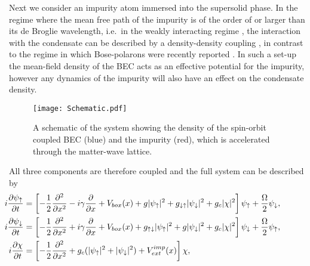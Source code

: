 \documentclass[12pt]{iopart}
\begin{document}
Next we consider an impurity atom immersed into the supersolid phase. 
In the regime where the mean free path of the impurity is of the order of or larger than its de Broglie wavelength, i.e.~in the weakly interacting regime \cite{grusdt:2015,grusdt:2017,Lingua:2018}, the interaction with the condensate can be described by a density-density coupling \cite{Bruderer_2008}, in contrast to the regime in which Bose-polarons were recently reported \cite{parish:2015,parish:2018}. In such a set-up the mean-field density of the BEC acts as an effective potential for the impurity, however any dynamics of the impurity will also have an effect on the condensate density. 
\begin{figure}[tb]
    \centering
    \texttt{[image: Schematic.pdf]}
    \caption{A schematic of the system showing the density of the spin-orbit coupled BEC (blue) and the impurity (red), which is accelerated through the matter-wave lattice.}
    \label{fig:Schematic}
\end{figure}
%
All three components are therefore coupled and the full system can  be described by
\begin{eqnarray}
    \hspace*{-40pt} 
    i\frac{\partial\psi_{\uparrow}}{\partial t} &=\left[-\frac{1}{2}\frac{\partial^2}{\partial x^2}-i \gamma \frac{\partial}{\partial x}+V_{box}(x)+g|\psi_{\uparrow}|^2+ g_{\downarrow \uparrow}|\psi_{\downarrow}|^2+{g}_c|\chi|^2 \right]\psi_{\uparrow}
  + \frac{\Omega}{2}\psi_{\downarrow},
  \label{eq:CGPE1}\\
\hspace*{-40pt} i\frac{\partial\psi_{\downarrow}}{\partial t} &=\left[-\frac{1}{2}\frac{\partial^2}{\partial x^2}+i \gamma \frac{\partial}{\partial x}+V_{box}(x)+g_{\uparrow \downarrow}|\psi_{\uparrow}|^2+g|\psi_{\downarrow}|^2+{g}_c|\chi|^2 \right]\psi_{\downarrow} 
  + \frac{\Omega}{2}\psi_{\uparrow},
  \label{eq:CGPE2}\\
\hspace*{-40pt}  
i\frac{\partial \chi}{\partial t} &=\left[-\frac{1}{2}\frac{\partial^2}{\partial x^2}+ g_c(|\psi_{\uparrow}|^2+|\psi_{\downarrow}|^2)+V_{{ext}}^{{imp}}(x) \right]\chi,
\label{eq:ImpurityDynamics}
\end{eqnarray}
\end{document}
